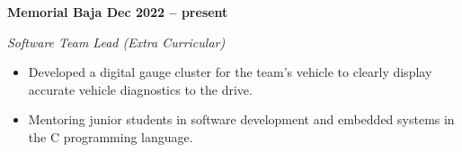 \vspace{0.1cm}
\textbf{Memorial Baja \hfill Dec 2022 -- present} \par
\textit{Software Team Lead (Extra Curricular)} \par
\begin{itemize}
    \item Developed a digital gauge cluster for the team's vehicle to clearly display accurate vehicle diagnostics to the drive.
    \item Mentoring junior students in software development and embedded systems in the C programming language.
\end{itemize} \par